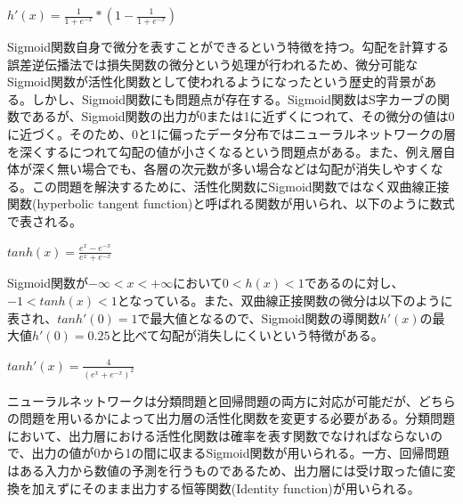 \documentclass{report}
\begin{document}
\begin{center}
\begin{math}
h'(x) = \frac{1}{1+e^{-x}} * (1 - \frac{1}{1+e^{-x}})
\end{math}
\end{center}

Sigmoid関数自身で微分を表すことができるという特徴を持つ。勾配を計算する誤差逆伝播法では損失関数の微分という処理が行われるため、微分可能なSigmoid関数が活性化関数として使われるようになったという歴史的背景がある。しかし、Sigmoid関数にも問題点が存在する。Sigmoid関数はS字カーブの関数であるが、Sigmoid関数の出力が0または1に近ずくにつれて、その微分の値は0に近づく。そのため、0と1に偏ったデータ分布ではニューラルネットワークの層を深くするにつれて勾配の値が小さくなるという問題点がある。また、例え層自体が深く無い場合でも、各層の次元数が多い場合などは勾配が消失しやすくなる。この問題を解決するために、活性化関数にSigmoid関数ではなく双曲線正接関数(hyperbolic tangent function)と呼ばれる関数が用いられ、以下のように数式で表される。


\begin{center}
\begin{math}
tanh(x) =  \frac{e^{x}-e^{-x}} {e^{x}+e^{-x}} 
\end{math}
\end{center}

Sigmoid関数が\begin{math}-\infty<x<+\infty\end{math}において\begin{math}0<h(x)<1\end{math}であるのに対し、\begin{math}-1<tanh(x)<1\end{math}となっている。また、双曲線正接関数の微分は以下のように表され、\begin{math}tanh'(0)=1\end{math}で最大値となるので、Sigmoid関数の導関数\begin{math}h'(x)\end{math}の最大値\begin{math}h'(0)=0.25\end{math}と比べて勾配が消失しにくいという特徴がある。

\begin{center}
\begin{math}
tanh'(x) =  \frac{4} {(e^x+e^{-x})^{2}} 
\end{math}
\end{center}

ニューラルネットワークは分類問題と回帰問題の両方に対応が可能だが、どちらの問題を用いるかによって出力層の活性化関数を変更する必要がある。分類問題において、出力層における活性化関数は確率を表す関数でなければならないので、出力の値が0から1の間に収まるSigmoid関数が用いられる。一方、回帰問題はある入力から数値の予測を行うものであるため、出力層には受け取った値に変換を加えずにそのまま出力する恒等関数(Identity function)が用いられる。
\end{document}

